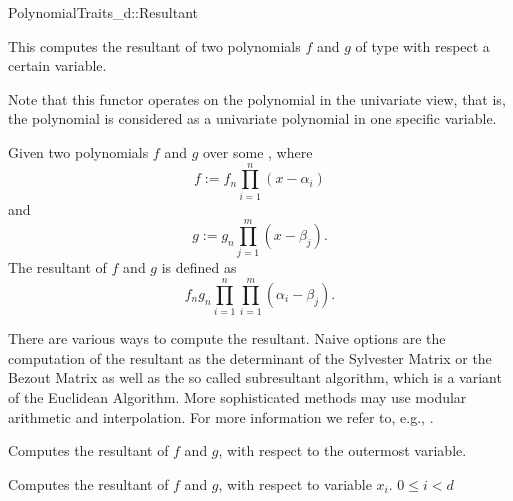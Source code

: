 \begin{ccRefConcept}{PolynomialTraits_d::Resultant}
\ccDefinition

This  computes the resultant of two polynomials 
$f$ and $g$ of type  with respect a 
certain variable.
 
Note that this functor operates on the polynomial in the univariate view, 
that is, the polynomial is considered as a univariate polynomial in one 
specific variable. 

Given two polynomials $f$ and $g$ over some , where 
\[f := f_n \prod_{i=1}^{n}{(x-\alpha_i)}\] 
and 
\[g :=  g_n \prod_{j=1}^{m}{(x-\beta_j)}.\] 
The resultant of $f$ and $g$ is defined as 
\[f_n g_n \prod_{i=1}^{n}\prod_{i=1}^{m}{(\alpha_i-\beta_j)}.\] 

There are various ways to compute the resultant. 
Naive options are the computation of the 
resultant as the determinant of the Sylvester Matrix or the Bezout 
Matrix as well as the so called subresultant algorithm, 
which is a variant of the Euclidean Algorithm. 
More sophisticated methods may use modular arithmetic and interpolation. 
For more information we refer to, e.g., \cite{gg-mca-99}. 

\ccRefines 
{}

\ccTypes
{}
\ccGlue
{}
\ccGlue
{}

\ccOperations
{}
         { Computes the resultant of $f$ and $g$, 
           with respect to the outermost variable.}

         { Computes the resultant of $f$ and $g$,
           with respect to variable $x_i$. 
           \ccPrecond $0 \leq i  < d$ 
         }


\ccSeeAlso

\\
\\

\end{ccRefConcept}
